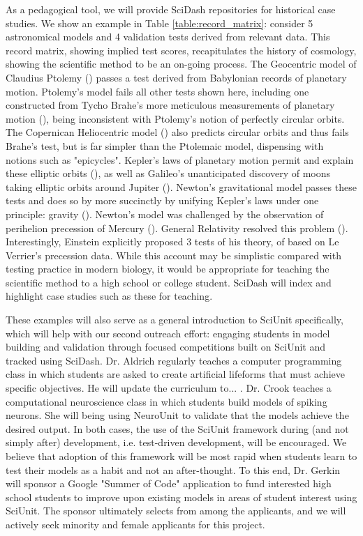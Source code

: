 \documentclass[11pt,letterpaper]{article}
\begin{document}
As a pedagogical tool, we will provide SciDash repositories for historical case studies.  We show an example in Table \ref{table:record_matrix}: consider 5 astronomical models and 4 validation tests derived from relevant data.  This record matrix, showing implied test scores, recapitulates the history of cosmology, showing the scientific method to be an on-going process.  The Geocentric model of Claudius Ptolemy (\cite{ptolemy_almagest_150}) passes a test derived from Babylonian records of planetary motion.  Ptolemy's model fails all other tests shown here, including one constructed from Tycho Brahe's more meticulous measurements of planetary motion (\cite{kepler_rudolphine_1627}), being inconsistent with Ptolemy's notion of perfectly circular orbits.  The Copernican Heliocentric model (\cite{copernicus_revolutionibus_1543}) also predicts circular orbits and thus fails Brahe's test, but is far simpler than the Ptolemaic model, dispensing with notions such as "epicycles".  Kepler's laws of planetary motion permit and explain these elliptic orbits (\cite{kepler_astronomia_1609}), as well as Galileo's unanticipated discovery of moons taking elliptic orbits around Jupiter (\cite{galilei_siderius_1610}).  Newton's gravitational model passes these tests and does so by more succinctly by unifying Kepler's laws under one principle: gravity (\cite{newton_philosophiae_1687}).  Newton's model was challenged by the observation of perihelion precession of Mercury (\cite{le_verrier_lettre_1859}).  General Relativity resolved this problem (\cite{einstein_foundation_1916}).  Interestingly, Einstein explicitly proposed 3 tests of his theory, of based on Le Verrier's precession data.  While this account may be simplistic compared with testing practice in modern biology, it would be appropriate for teaching the scientific method to a high school or college student.  SciDash will index and highlight case studies such as these for teaching.  

These examples will also serve as a general introduction to SciUnit specifically, which will help with our second outreach effort: engaging students in model building and validation through focused competitions built on SciUnit and tracked using SciDash.  Dr. Aldrich regularly teaches a computer programming class in which students are asked to create artificial lifeforms that must achieve specific objectives.  He will update the curriculum to... .  Dr. Crook teaches a computational neuroscience class in which students build models of spiking neurons.  She will being using NeuroUnit to validate that the models achieve the desired output.  In both cases, the use of the SciUnit framework during (and not simply after) development, i.e. test-driven development, will be encouraged.  We believe that adoption of this framework will be most rapid when students learn to test their models as a habit and not an after-thought.  To this end, Dr. Gerkin will sponsor a Google "Summer of Code" application \cite{summerofcode} to fund interested high school students to improve upon existing models in areas of student interest using SciUnit.  The sponsor ultimately selects from among the applicants, and we will actively seek minority and female applicants for this project.  
\end{document}
